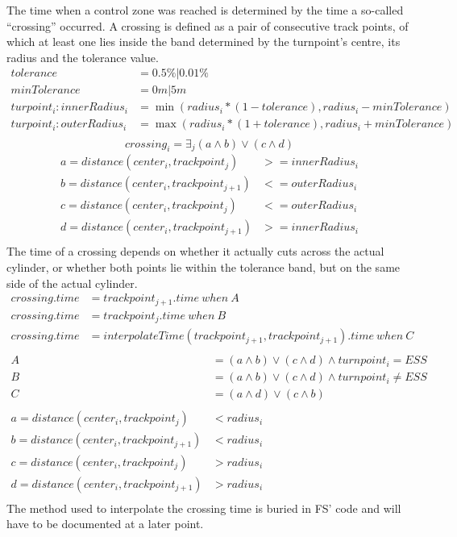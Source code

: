 \documentclass{article}
\begin{document}
The time when a control zone was reached is determined by the time a so-called
“crossing” occurred. A crossing is defined as a pair of consecutive track
points, of which at least one lies inside the band determined by the
turnpoint’s centre, its radius and the tolerance value.
\begin{align*}
    tolerance &= 0.5\% | 0.01\% \\
    minTolerance &= 0m | 5m \\
    turpoint_i : innerRadius_i &= \min(radius_i * (1 - tolerance), radius_i - minTolerance) \\
    turpoint_i : outerRadius_i &= \max(radius_i * (1 + tolerance), radius_i + minTolerance) \\
\end{align*}
\begin{equation*}
    crossing_i = \exists_j (a \land b) \lor (c \land d)
\end{equation*}
\begin{align*}
    a = distance(center_i, trackpoint_j) &>= innerRadius_i \\
    b = distance(center_i, trackpoint_{j+1}) &<= outerRadius_i \\
    c = distance(center_i, trackpoint_j) &<= outerRadius_i \\
    d = distance(center_i, trackpoint_{j+1}) &>= innerRadius_i \\
\end{align*}
The time of a crossing depends on whether it actually cuts across the actual
cylinder, or whether both points lie within the tolerance band, but on the same
side of the actual cylinder.
\begin{align*}
    crossing . time &= trackpoint_{j+1} . time \ when \ A \\
    crossing . time &= trackpoint_j . time \ when \ B \\
    crossing . time &= interpolateTime(trackpoint_{j+1}, trackpoint_{j+1}) . time \ when \ C \\
\end{align*}
\begin{align*}
    A &= (a \land b) \lor (c \land d) \land turnpoint_i = ESS \\
    B &= (a \land b) \lor (c \land d) \land turnpoint_i \neq ESS \\
    C &= (a \land d) \lor (c \land b) \\
    \\
    a = distance(center_i, trackpoint_j) &< radius_i \\
    b = distance(center_i, trackpoint_{j+1}) &< radius_i \\
    c = distance(center_i, trackpoint_j) &> radius_i \\
    d = distance(center_i, trackpoint_{j+1}) &> radius_i \\
\end{align*}
The method used to interpolate the crossing time is buried in FS’ code and will
have to be documented at a later point.
\end{document}

